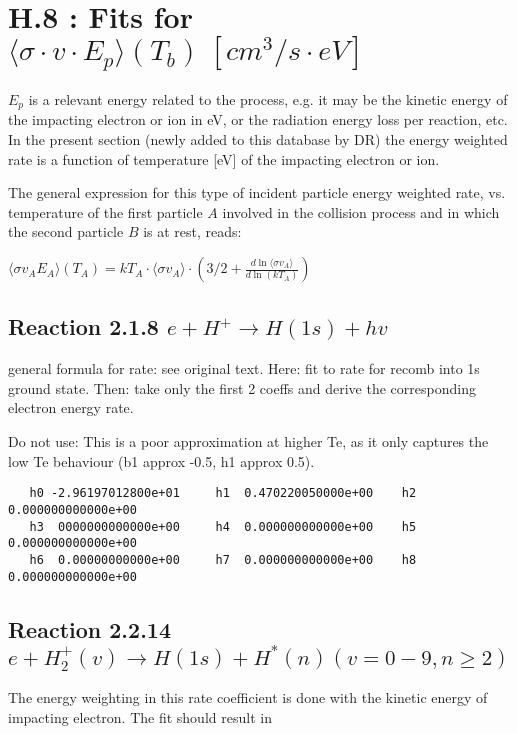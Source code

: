 \documentclass[12pt,dvipdfmx]{article}
\begin{document}
\newpage

\section{H.8 : Fits for $\langle\sigma \cdot v \cdot E_p \rangle (T_b) \ [cm^3/s
\cdot eV]$}

$E_p$ is a relevant energy related to the process, e.g. it may be the kinetic energy of the impacting electron or ion in eV,
or the radiation energy loss per reaction, etc.
In the present section (newly added to this database by DR)
the energy weighted rate is a function of temperature [eV] of the
impacting electron or ion.

The general expression for this type of incident particle energy weighted
rate, vs. temperature of the first particle $A$ involved in the collision process
and in which the second particle $B$ is at rest, reads:

$\langle\sigma v_A E_{A}\rangle(T_A) = kT_A \cdot \langle\sigma v_A\rangle \cdot
\left(3/2 + \frac{d \ln \langle\sigma v_A\rangle}{d \ln(kT_A)}\right)$

\newpage

\subsection{
Reaction 2.1.8  $  e + H^+ \rightarrow H(1s) + hv $}
general formula for rate: see original text. Here:  fit to rate for recomb into
1s ground state.
Then: take only the first 2 coeffs and derive the corresponding electron energy rate.


Do not use: This is a poor approximation at higher Te, as it only captures the low Te
behaviour (b1 approx -0.5, h1 approx 0.5).



\begin{small}\begin{verbatim}
   h0 -2.96197012800e+01     h1  0.470220050000e+00    h2  0.000000000000e+00
   h3  0000000000000e+00     h4  0.000000000000e+00    h5  0.000000000000e+00
   h6  0.00000000000e+00     h7  0.000000000000e+00    h8  0.000000000000e+00
\end{verbatim}\end{small}

\subsection{
Reaction 2.2.14   $e + H_2^+(v) \rightarrow H(1s) + H^*(n)   (v=0-9, n \ge 2) $
}
The energy weighting in this rate coefficient is done with the kinetic energy of
impacting electron.
The fit should result in
\end{document}
